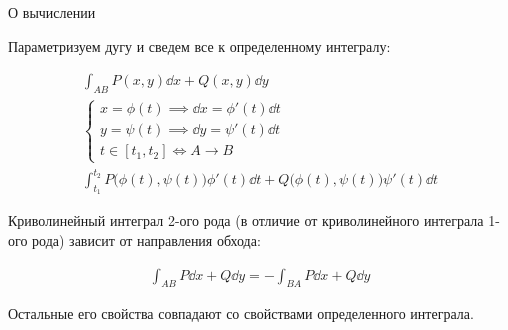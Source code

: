 \begin{remark}
  О вычислении

  Параметризуем дугу и сведем все к определенному интегралу:

  \begin{align*}
    \int_{AB} P(x, y) \dd x + Q(x, y) \dd y \\
    \begin{cases}
      x = \phi(t) \implies \dd x = \phi'(t) \dd t \\
      y = \psi(t) \implies \dd y = \psi'(t) \dd t \\
      t \in [t_{1}, t_{2}] \iff A \to B
    \end{cases}
    \\
    \int_{t_{1}}^{t_{2}}
      P \Big( \phi(t), \psi(t) \Big) \phi'(t) \dd t
      + Q \Big( \phi(t), \psi(t) \Big) \psi'(t) \dd t
  \end{align*}
\end{remark}

\begin{remark}
  Криволинейный интеграл 2-ого рода (в отличие от криволинейного интеграла
  1-ого рода) зависит от направления обхода:

  \begin{align*}
    \int_{AB} P \dd x + Q \dd y = -\int_{BA} P \dd x + Q \dd y
  \end{align*}

  Остальные его свойства совпадают со свойствами определенного интеграла.
\end{remark}

